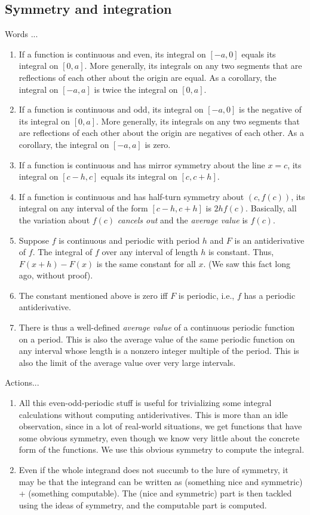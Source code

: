 \documentclass[10pt]{amsart}
\begin{document}
\subsection{Symmetry and integration}

Words ...

\begin{enumerate}
\item If a function is continuous and even, its integral on $[-a,0]$
  equals its integral on $[0,a]$. More generally, its integrals on any
  two segments that are reflections of each other about the origin are
  equal. As a corollary, the integral on $[-a,a]$ is twice the
  integral on $[0,a]$.
\item If a function is continuous and odd, its integral on $[-a,0]$ is
  the negative of its integral on $[0,a]$. More generally, its
  integrals on any two segments that are reflections of each other
  about the origin are negatives of each other. As a corollary, the
  integral on $[-a,a]$ is zero.
\item If a function is continuous and has mirror symmetry about the
  line $x = c$, its integral on $[c-h,c]$ equals its integral on
  $[c,c+h]$.
\item If a function is continuous and has half-turn symmetry about
  $(c,f(c))$, its integral on any interval of the form $[c-h,c+h]$ is
  $2hf(c)$. Basically, all the variation about $f(c)$ {\em cancels
  out} and the {\em average value} is $f(c)$.
\item Suppose $f$ is continuous and periodic with period $h$ and $F$
  is an antiderivative of $f$. The integral of $f$ over any interval
  of length $h$ is constant. Thus, $F(x + h) - F(x)$ is the same
  constant for all $x$. (We saw this fact long ago, without proof).
\item The constant mentioned above is zero iff $F$ is periodic, i.e.,
  $f$ has a periodic antiderivative.
\item There is thus a well-defined {\em average value} of a continuous
  periodic function on a period. This is also the average value of the
  same periodic function on any interval whose length is a nonzero
  integer multiple of the period. This is also the limit of the
  average value over very large intervals.
\end{enumerate}

Actions...

\begin{enumerate}
\item All this even-odd-periodic stuff is useful for trivializing some
  integral calculations without computing antiderivatives. This is
  more than an idle observation, since in a lot of real-world
  situations, we get functions that have some obvious symmetry, even
  though we know very little about the concrete form of the
  functions. We use this obvious symmetry to compute the integral.
\item Even if the whole integrand does not succumb to the lure of
  symmetry, it may be that the integrand can be written as (something
  nice and symmetric) + (something computable). The (nice and
  symmetric) part is then tackled using the ideas of symmetry, and the
  computable part is computed.
\end{enumerate}
\end{document}
